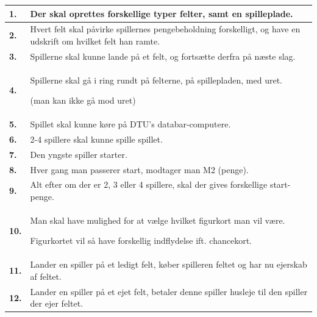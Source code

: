 \begin{tabular}{| l |p{13cm}|}

    \hline
    \textbf{1.} 
    &
    Der skal oprettes forskellige typer felter, samt en spilleplade. 
    \\
    
    \hline
    \textbf{2.} 
    &
    Hvert felt skal påvirke spillernes pengebeholdning forskelligt, og have en udskrift om hvilket felt han ramte. 
    \\
    
    \hline
    \textbf{3.} 
    &
    Spillerne skal kunne lande på et felt, og fortsætte derfra på næste slag. 
    \\
    
    \hline
    \textbf{4.} 
    &
    Spillerne skal gå i ring rundt på felterne, på spillepladen, med uret. 

    (man kan ikke gå mod uret) 
    \\
    
    \hline
    \textbf{5.} 
    &
    Spillet skal kunne køre på DTU’s databar-computere. 
    \\
    
    \hline
    \textbf{6.} 
    &
    2-4 spillere skal kunne spille spillet. 
    \\

    \hline
    \textbf{7.} 
    &
    Den yngste spiller starter. 
    \\
      
    \hline
    \textbf{8.}
    &
    Hver gang man passerer start, modtager man M2 (penge). 
    \\
      
    \hline
    \textbf{9.}
    &
    Alt efter om der er 2, 3 eller 4 spillere, skal der gives forskellige start-penge. 
    \\

    \hline
    \textbf{10.}
    &
    Man skal have mulighed for at vælge hvilket figurkort man vil være.
    
    Figurkortet vil så have forskellig indflydelse ift. chancekort. 
    \\
      
    \hline
    \textbf{11.}
    &
    Lander en spiller på et ledigt felt, køber spilleren feltet og har nu ejerskab af feltet. 
    \\
      
    \hline
    \textbf{12.}
    &
    Lander en spiller på et ejet felt, betaler denne spiller husleje til den spiller der ejer feltet. 
    \\
      

\end{tabular}
